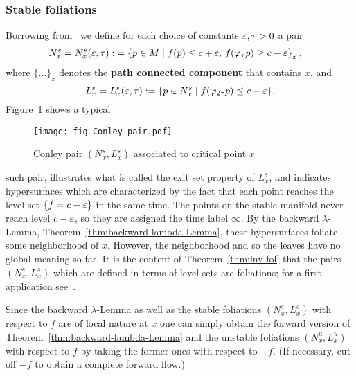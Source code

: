 \documentclass{article}
\begin{document}
\subsubsection*{Stable foliations}
Borrowing from~\cite{salamon:1990a}
we define for each choice of constants ${\varepsilon},\tau>0$ a pair
\begin{equation}\label{eq:Conley-set-NEW}
\begin{split}
     N_x^s=N_x^s(\eps,\tau)
   :&=
     \left\{p\in M\mid\text{$f(p)\le c+\eps$,
     $f(\varphi_\tau p)\ge c-\eps$}\right\}_x ,
\end{split}
\end{equation}
where $\{\ldots\}_x$ denotes the
{\bf path connected component}
that contains $x$, and
\begin{equation}\label{eq:L_x}
     L_x^s=L_x^s(\eps,\tau)
     :=\{p\in N_x^s\mid f(\varphi_{2\tau} p)\le c-\eps\}.
\end{equation}
Figure~\ref{fig:fig-Conley-pair} shows a typical
%
\begin{figure}%
  \centering
  \texttt{[image: fig-Conley-pair.pdf]}
  \caption{Conley pair $(N_x^s,L_x^s)$ associated to critical point $x$
           }
  \label{fig:fig-Conley-pair}
\end{figure}
%
such pair, illustrates what is called the exit set property
of $L_x^s$, and indicates hypersurfaces which are characterized by the
fact that each point reaches the level set $\{f=c-{\varepsilon}\}$ in the same time.
The points on the stable manifold never reach level $c-{\varepsilon}$, so they are
assigned the time label $\infty$. 
By the backward $\lambda$-Lemma,
Theorem~\ref{thm:backward-lambda-Lemma},
these hypersurfaces foliate some neighborhood of $x$.
However, the neighborhood and so the leaves have no global meaning so far.
It is the content of Theorem~\ref{thm:inv-fol} that the pairs
$(N_x^s,L_x^s)$ which are defined in terms of level sets are foliations;
for a first application see~\cite{weber:2014e}.

\begin{remark}\label{rem:forward-unstable-case}
Since the backward $\lambda$-Lemma as well as the stable foliations
$(N_x^s,L_x^s)$ with respect to $f$ are of local nature at $x$ one can simply obtain
the forward version of Theorem~\ref{thm:backward-lambda-Lemma}
and the unstable foliations $(N_x^u,L_x^u)$ with respect to $f$
by taking the former ones with respect to $-f$.
(If necessary, cut off $-f$ to obtain a complete forward flow.)
\end{remark}
\end{document}
